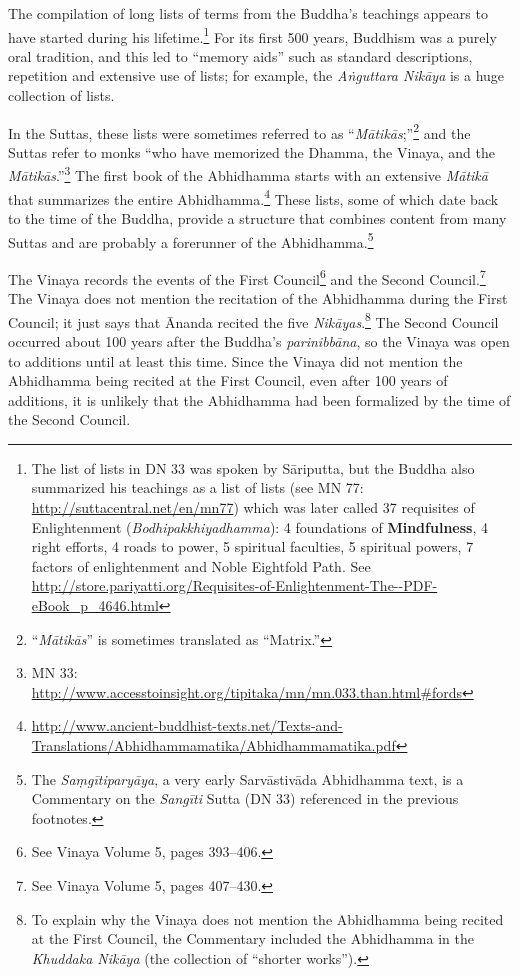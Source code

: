 The compilation of long lists of terms from the Buddha’s teachings appears to have started during his lifetime.\footnote{The list of lists in DN 33 was spoken by Sāriputta, but the Buddha also summarized his teachings as a list of lists (see MN 77: \url{http://suttacentral.net/en/mn77}) which was later called 37 requisites of Enlightenment (\textit{Bodhipakkhiyadhamma}): 4 foundations of \textbf{Mindfulness}, 4 right efforts, 4 roads to power, 5 spiritual faculties, 5 spiritual powers, 7 factors of enlightenment and Noble Eightfold Path. See \url{http://store.pariyatti.org/Requisites-of-Enlightenment-The--PDF-eBook_p_4646.html}} For its first 500 years, Buddhism was a purely oral tradition, and this led to “memory aids” such as standard descriptions, repetition and extensive use of lists; for example, the \textit{Aṅguttara Nikāya} is a huge collection of lists. 

In the Suttas, these lists were sometimes referred to as “\textit{Mātikās};”\footnote{“\textit{Mātikās}” is sometimes translated as “Matrix.”} and the Suttas refer to monks “who have memorized the Dhamma, the Vinaya, and the \textit{Mātikās}.”\footnote{MN 33: \url{http://www.accesstoinsight.org/tipitaka/mn/mn.033.than.html\#fords}} The first book of the Abhidhamma starts with an extensive \textit{Mātikā} that summarizes the entire Abhidhamma.\footnote{\url{http://www.ancient-buddhist-texts.net/Texts-and-Translations/Abhidhammamatika/Abhidhammamatika.pdf}} These lists, some of which date back to the time of the Buddha, provide a structure that combines content from many Suttas and are probably a forerunner of the Abhidhamma.\footnote{The \textit{Saṃgītiparyāya}, a very early Sarvāstivāda Abhidhamma text, is a Commentary on the \textit{Sangīti} Sutta (DN 33) referenced in the previous footnotes.}

The Vinaya records the events of the First Council\footnote{See Vinaya Volume 5, pages 393--406.} and the Second Council.\footnote{See Vinaya Volume 5, pages 407--430.} The Vinaya does not mention the recitation of the Abhidhamma during the First Council; it just says that Ānanda recited the five \textit{Nikāyas}.\footnote{To explain why the Vinaya does not mention the Abhidhamma being recited at the First Council, the Commentary included the Abhidhamma in the \textit{Khuddaka Nikāya} (the collection of “shorter works”).} The Second Council occurred about 100 years after the Buddha’s \textit{parinibbāna}, so the Vinaya was open to additions until at least this time. Since the Vinaya did not mention the Abhidhamma being recited at the First Council, even after 100 years of additions, it is unlikely that the Abhidhamma had been formalized by the time of the Second Council. 

